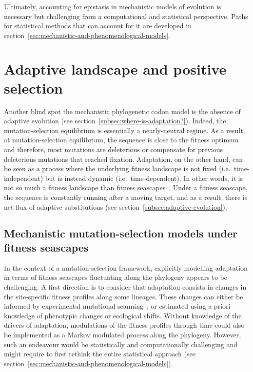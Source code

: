 Ultimately, accounting for epistasis in mechanistic models of evolution is necessary but challenging from a computational and statistical perspective.
Paths for statistical methods that can account for it are developed in section~\ref{sec:mechanistic-and-phenomenological-models}.

\section{Adaptive landscape and positive selection}
\label{sec:adaptative-landscape}

Another blind spot the mechanistic phylogenetic codon model is the absence of adaptive evolution (see section~\ref{subsec:where-is-adaptation?}).
Indeed, the mutation-selection equilibrium is essentially a nearly-neutral regime.
As a result, at mutation-selection equilibrium, the sequence is close to the fitness optimum and therefore, most mutations are deleterious or compensate for previous deleterious mutations that reached fixation.
Adaptation, on the other hand, can be seen as a process where the underlying fitness landscape is not fixed (i.e.~time-independent) but is instead dynamic (i.e.~time-dependent).
In other words, it is not so much a fitness landscape than fitness seascapes~\citep{Mustonen2009}.
Under a fitness seascape, the sequence is constantly running after a moving target, and as a result, there is net flux of adaptive substitutions (see section~\ref{subsec:adaptive-evolution}).

\subsection{Mechanistic mutation-selection models under fitness seascapes}
\label{subsec:mechanistic-fluctuating-selection}

In the context of a mutation-selection framework, explicitly modelling adaptation in terms of fitness seascapes fluctuating along the phylogeny appears to be challenging.
A first direction is to consider that adaptation consists in changes in the site-specific fitness profiles along some lineages.
These changes can either be informed by experimental mutational scanning~\citep{Bloom2017}, or estimated using a priori knowledge of phenotypic changes or ecological shifts\citep{Tamuri2009, Parto2018, Parto2018a}.
Without knowledge of the drivers of adaptation, modulations of the fitness profiles through time could also be implemented as a Markov modulated process along the phylogeny.
However, such an endeavour would be statistically and computationally challenging and might require to first rethink the entire statistical approach (see section~\ref{sec:mechanistic-and-phenomenological-models}).

